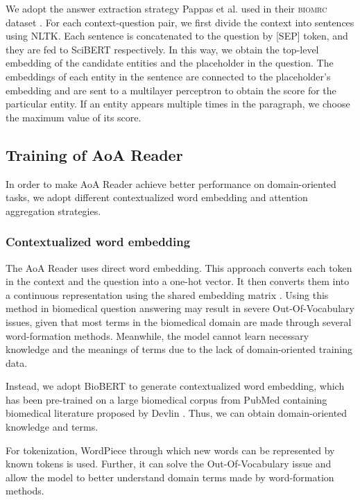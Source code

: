 \documentclass[sigconf, screen]{acmart}
\newcommand{\biomrc}{{\scshape{biomrc}}\xspace}
\newcommand{\pubmed}{PubMed\xspace}
\newcommand{\scibert}{Sci\-BERT\xspace}
\newcommand{\biobert}{Bio\-BERT\xspace}
\newcommand{\aoa}{AoA Reader\xspace}
\begin{document}
We adopt the answer extraction strategy Pappas et al. used in their \biomrc dataset \cite{pappasBioMRCDatasetBiomedical2020}. For each context-question pair, we first divide the context into sentences using NLTK\cite{birdNLTKNaturalLanguage2004}. Each sentence is concatenated to the question by [SEP] token, and they are fed to \scibert respectively. In this way, we obtain the top-level embedding of the candidate entities and the placeholder in the question. The embeddings of each entity in the sentence are connected to the placeholder's embedding and are sent to a multilayer perceptron to obtain the score for the particular entity. If an entity appears multiple times in the paragraph, we choose the maximum value of its score.

\subsection{Training of \aoa}

In order to make \aoa \cite{cuiAttentionoverAttentionNeuralNetworks2017} achieve better performance on domain-oriented tasks, we adopt different contextualized word embedding and attention aggregation strategies.

\subsubsection{Contextualized word embedding}

The \aoa uses direct word embedding. This approach converts each token in the context  and the question  into a one-hot vector. It then converts them into a continuous representation using the shared embedding matrix . Using this method in biomedical question answering may result in severe Out-Of-Vocabulary issues, given that most terms in the biomedical domain are made through several word-formation methods. Meanwhile, the model cannot learn necessary knowledge and the meanings of terms due to the lack of domain-oriented training data.

Instead, we adopt \biobert to generate contextualized word embedding, which has been pre-trained on a large biomedical corpus from \pubmed containing biomedical literature proposed by Devlin \cite{devlinBERTPretrainingDeep2019}. Thus, we can obtain domain-oriented knowledge and terms.

For tokenization, WordPiece \cite{wuGoogleNeuralMachine2016} through which new words can be represented by known tokens is used. Further, it can solve the Out-Of-Vocabulary issue and allow the model to better understand domain terms made by word-formation methods.
\end{document}
